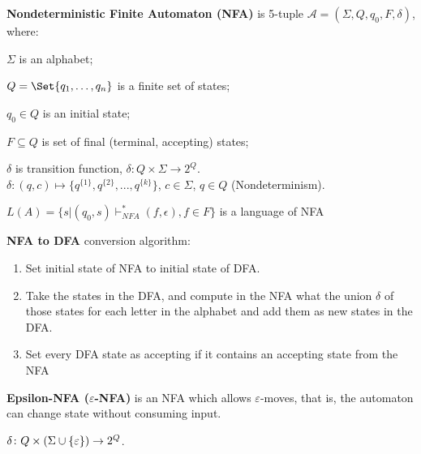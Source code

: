 \documentclass[a4paper,10pt]{article}
\begin{document}
\begin{terms}
    \item \textbf{Nondeterministic Finite Automaton (NFA)} is 5-tuple $\mathcal{A} = (\Sigma, Q, q_0, F, \delta)$, where:

    \begin{terms}
        \item $\Sigma$ is an alphabet;

        \item $Q = \Set{q_1, \dots, q_n}$ is a finite set of states;

        \item $q_0 \in Q$ is an initial state;

        \item $F \subseteq Q$ is set of final (terminal, accepting) states;

        \item $\delta$ is transition function, $\delta: Q \times \Sigma \to 2^Q$.\\
        $\delta: (q,c) \mapsto \{q^{\{1\}},q^{\{2\}}, ... , q^{\{k\}}\}$, $c \in \Sigma$, $q \in Q$ (Nondeterminism).

        \item $L(A) = \{ s| (q_0, s) \vdash^*_{NFA} (f, \epsilon), f\in F\}$ is a language of NFA
    \end{terms}

    \item \textbf{NFA to DFA} conversion algorithm:

    \begin{enumerate}
        \item Set initial state of NFA to initial state of DFA.

        \item Take the states in the DFA, and compute in the NFA what the union $\delta$ of those states for each letter in the alphabet and add them as new states in the DFA.

        \item Set every DFA state as accepting if it contains an accepting state from the NFA
    \end{enumerate}

    \item \textbf{Epsilon-NFA ($\varepsilon$-NFA)} is an NFA which allows $\varepsilon$-moves, that is, the automaton can change state without consuming input.

    \begin{terms}
        \item $\delta \colon Q \times (\Sigma \cup \{\varepsilon\}) \to 2^Q$.
    \end{terms}


\end{terms}
\end{document}
